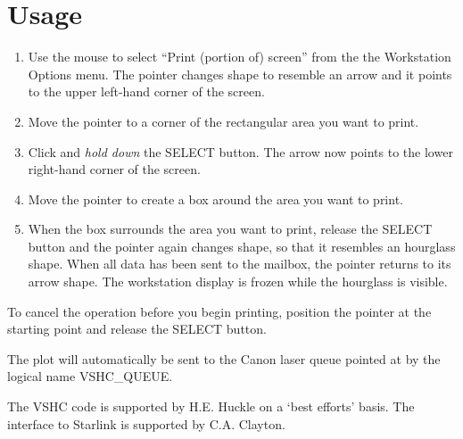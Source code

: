 \section{Usage}

\begin{enumerate}

\item Use the mouse to select ``Print (portion of) screen'' from the 
the Workstation Options menu. The pointer changes shape to resemble an
arrow and it points to the upper left-hand corner of the screen.

\item Move the pointer to a corner of the rectangular area you want to 
print.

\item Click and {\it hold down} the SELECT button. The arrow now points to the 
lower right-hand corner of the screen.

\item Move the pointer to create a box around the area you want to print.

\item When the box surrounds the area you want to print, release the  SELECT
button and the pointer again changes shape, so that it resembles an hourglass
shape. When all data has been sent to the mailbox, the pointer returns to its
arrow shape. The workstation display is frozen while the hourglass is visible.

\end{enumerate}

To cancel the operation before you begin printing, position the pointer at
the starting point and release the SELECT button.

The plot will automatically be sent to the Canon laser queue pointed at by
the logical name VSHC\_QUEUE.

The VSHC code is supported by H.E. Huckle on a `best efforts' basis. The
interface to Starlink is supported by C.A. Clayton.

 
